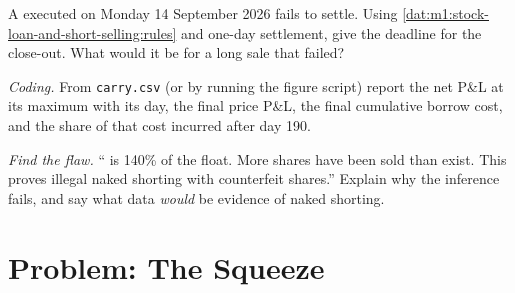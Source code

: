 \begin{exercise}[$\star\star$]\label{exo:m1:stock-loan-and-short-selling:6}
A  executed on Monday 14 September 2026 fails to settle. Using
\cref{dat:m1:stock-loan-and-short-selling:rules} and one-day settlement,
give the deadline for the close-out. What would it be for a long sale that
failed?
\end{exercise}

\begin{exercise}[$\star\star\star$]\label{exo:m1:stock-loan-and-short-selling:7}
\emph{Coding.} From \texttt{carry.csv} (or by running the figure script)
report the net P\&L at its maximum with its day, the final price P\&L, the
final cumulative borrow cost, and the share of that cost incurred after day
190.
\end{exercise}

\begin{exercise}[$\star\star\star$]\label{exo:m1:stock-loan-and-short-selling:8}
\emph{Find the flaw.} `` is 140\% of the float. More shares have
been sold than exist. This proves illegal naked shorting with counterfeit
shares.'' Explain why the inference fails, and say what data \emph{would} be
evidence of naked shorting.
\end{exercise}

\section{Problem: The Squeeze}

